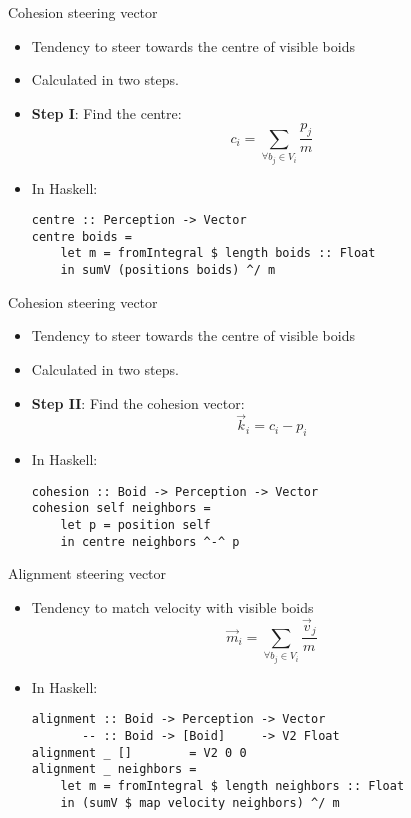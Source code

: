 \documentclass{beamer}
\begin{document}
\begin{frame}[fragile]
\huge{Cohesion steering vector}\normalsize
    \begin{itemize}
        \item Tendency to steer towards the centre of visible boids
        \item Calculated in two steps.
        \item<2-> \textbf{Step I}: Find the centre:
            \begin{equation*}
            c_i = \sum\limits_{\forall b_j \in V_i} \frac{p_j}{m}
            \end{equation*}
        \item<3> In Haskell:
        \begin{verbatim}
centre :: Perception -> Vector
centre boids =
    let m = fromIntegral $ length boids :: Float
    in sumV (positions boids) ^/ m
        \end{verbatim}
    \end{itemize}

\end{frame}

\begin{frame}[fragile]
\huge{Cohesion steering vector}\normalsize
    \begin{itemize}
        \item Tendency to steer towards the centre of visible boids
        \item Calculated in two steps.
\item<1-> \textbf{Step II}: Find the cohesion vector:
            \begin{equation*}
            \vec{k}_i = c_i - p_i
            \end{equation*}
        \item<2> In Haskell:
        \begin{verbatim}
cohesion :: Boid -> Perception -> Vector
cohesion self neighbors =
    let p = position self
    in centre neighbors ^-^ p
        \end{verbatim}
    \end{itemize}
\end{frame}

\begin{frame}[fragile]
    \huge{Alignment steering vector}\normalsize
    \begin{itemize}
    \item Tendency to match velocity with visible boids
    \begin{equation*}
    \vec{m}_i = \sum\limits_{\forall b_j \in V_i} \frac{\vec{v}_j}{m}
    \end{equation*}
    \item<2-> In Haskell:
    \begin{verbatim}
alignment :: Boid -> Perception -> Vector
       -- :: Boid -> [Boid]     -> V2 Float
alignment _ []        = V2 0 0
alignment _ neighbors =
    let m = fromIntegral $ length neighbors :: Float
    in (sumV $ map velocity neighbors) ^/ m
    \end{verbatim}
    \end{itemize}
\end{frame}
\end{document}
